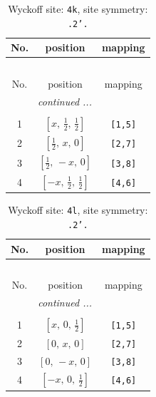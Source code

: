 \documentclass[fleqn,8pt]{jsarticle}
\begin{document}
\renewcommand{\arraystretch}{1.2}
\begin{longtable}{ccc}
\caption{Wyckoff site: {\tt 4k}, site symmetry: {\tt .2'.}}
 \\
 \hline \hline
No. & position & mapping \\ \hline \endfirsthead

\multicolumn{2}{l}{\tablename\ \thetable{}} \\
 \hline \hline
No. & position & mapping \\ \hline \endhead

 \hline \hline
\multicolumn{2}{r}{\footnotesize\it continued ...} \\ \endfoot

 \hline \hline
\multicolumn{2}{r}{} \\ \endlastfoot

1 & $\left[ x,\, \frac{1}{2},\, \frac{1}{2} \right]$ & {\tt [1,5]} \\ \hline
2 & $\left[ \frac{1}{2},\, x,\, 0 \right]$ & {\tt [2,7]} \\ \hline
3 & $\left[ \frac{1}{2},\, - x,\, 0 \right]$ & {\tt [3,8]} \\ \hline
4 & $\left[ - x,\, \frac{1}{2},\, \frac{1}{2} \right]$ & {\tt [4,6]} \\
\end{longtable}
\renewcommand{\arraystretch}{1.2}
\begin{longtable}{ccc}
\caption{Wyckoff site: {\tt 4l}, site symmetry: {\tt .2'.}}
 \\
 \hline \hline
No. & position & mapping \\ \hline \endfirsthead

\multicolumn{2}{l}{\tablename\ \thetable{}} \\
 \hline \hline
No. & position & mapping \\ \hline \endhead

 \hline \hline
\multicolumn{2}{r}{\footnotesize\it continued ...} \\ \endfoot

 \hline \hline
\multicolumn{2}{r}{} \\ \endlastfoot

1 & $\left[ x,\, 0,\, \frac{1}{2} \right]$ & {\tt [1,5]} \\ \hline
2 & $\left[ 0,\, x,\, 0 \right]$ & {\tt [2,7]} \\ \hline
3 & $\left[ 0,\, - x,\, 0 \right]$ & {\tt [3,8]} \\ \hline
4 & $\left[ - x,\, 0,\, \frac{1}{2} \right]$ & {\tt [4,6]} \\
\end{longtable}
\end{document}
